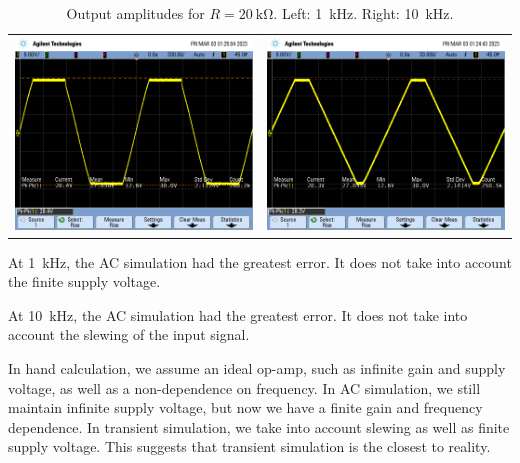 \documentclass[11pt]{article}
\begin{document}
\begin{table}[H]
\caption{\label{fig:20k}Output amplitudes for \(R = \qty{20}{\kilo\ohm}\). Left: \qty{1}{\kilo\hertz}. Right: \qty{10}{\kilo\hertz}.}
\centering
\begin{tabular}{ll}
\includegraphics[width=8cm]{./20k_1k.png} & \includegraphics[width=8cm]{./20k_10k.png}\\[0pt]
\end{tabular}
\end{table}

At \qty{1}{\kilo\hertz}, the AC simulation had the greatest error.
It does not take into account the finite supply voltage.

At \qty{10}{\kilo\hertz}, the AC simulation had the greatest error.
It does not take into account the slewing of the input signal.

In hand calculation, we assume an ideal op-amp, such as infinite gain and supply voltage, as well as a non-dependence on frequency.
In AC simulation, we still maintain infinite supply voltage, but now we have a finite gain and frequency dependence.
In transient simulation, we take into account slewing as well as finite supply voltage.
This suggests that transient simulation is the closest to reality.
\end{document}
